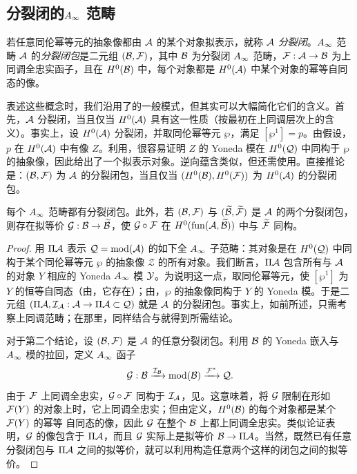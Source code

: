 \subsection{分裂闭的\texorpdfstring{$A_\infty$}{A∞} 范畴}\label{sec:4c}
\begin{definition*}
若任意同伦幂等元的抽象像都由 $\mathcal A$ 的某个对象拟表示，就称 $\mathcal A$ \emph{分裂闭}。$A_\infty$ 范畴 $\mathcal A$ 的\emph{分裂闭包}是二元组 $(\mathcal B,\mathcal F)$，其中 $\mathcal B$ 为分裂闭 $A_\infty$ 范畴，$\mathcal F:\mathcal A\to\mathcal B$ 为上同调全忠实函子，且在 $H^0(\mathcal B)$ 中，每个对象都是 $H^0(\mathcal A)$ 中某个对象的幂等自同态的像。
\end{definition*}
表述这些概念时，我们沿用了的一般模式，但其实可以大幅简化它们的含义。首先，$\mathcal A$ 分裂闭，当且仅当 $H^0(\mathcal A)$ 具有这一性质（按最初在上同调层次上的含义）。事实上，设 $H^0(\mathcal A)$ 分裂闭，并取同伦幂等元 $\wp$，满足 $[\wp^1]=p$。由假设，$p$ 在 $H^0(\mathcal A)$ 中有像 $Z$。利用，很容易证明 $Z$ 的 Yoneda 模在 $H^0(\mathcal Q)$ 中同构于 $\wp$ 的抽象像，因此给出了一个拟表示对象。逆向蕴含类似，但还需使用。直接推论是：$(\mathcal B,\mathcal F)$ 为 $\mathcal A$ 的分裂闭包，当且仅当 $(H^0(\mathcal B),H^0(\mathcal F))$ 为 $H^0(\mathcal A)$ 的分裂闭包。
\begin{lemma}\label{st:4.7}
每个 $A_\infty$ 范畴都有分裂闭包。此外，若 $(\mathcal B,\mathcal F)$ 与 $(\widetilde{\mathcal B},\widetilde{\mathcal F})$ 是 $\mathcal A$ 的两个分裂闭包，则存在拟等价 $\mathcal G:\mathcal B\to\widetilde{\mathcal B}$，使 $\mathcal G\circ\mathcal F$ 在 $H^0(\operatorname{fun}(\mathcal A,\widetilde{\mathcal B}))$ 中与 $\widetilde{\mathcal F}$ 同构。
\end{lemma}
\begin{proof}
用 $\Pi\mathcal A$ 表示 $\mathcal Q=\operatorname{mod}(\mathcal A)$ 的如下全 $A_\infty$ 子范畴：其对象是在 $H^0(\mathcal Q)$ 中同构于某个同伦幂等元 $\wp$ 的抽象像 $\mathcal Z$ 的所有对象。我们断言，$\Pi\mathcal A$ 包含所有与 $\mathcal A$ 的对象 $Y$ 相应的 Yoneda $A_\infty$ 模 $\mathcal Y$。为说明这一点，取同伦幂等元，使 $[\wp^1]$ 为 $Y$ 的恒等自同态（由，它存在）；由，$\wp$ 的抽象像同构于 $Y$ 的 Yoneda 模。于是二元组 $(\Pi\mathcal A,\mathcal I_{\mathcal A}:\mathcal A\to\Pi\mathcal A\subset\mathcal Q)$ 就是 $\mathcal A$ 的分裂闭包。事实上，如前所述，只需考察上同调范畴；在那里，同样结合与就得到所需结论。

对于第二个结论，设 $(\mathcal B,\mathcal F)$ 是 $\mathcal A$ 的任意分裂闭包。利用 $\mathcal B$ 的 Yoneda 嵌入与 $A_\infty$ 模的拉回，定义 $A_\infty$ 函子
\[
\mathcal G:\mathcal B\xrightarrow{\mathcal I_{\mathcal B}}\operatorname{mod}(\mathcal B)\xrightarrow{\mathcal F^*}\mathcal Q.
\]
由于 $\mathcal F$ 上同调全忠实，$\mathcal G\circ\mathcal F$ 同构于 $\mathcal I_{\mathcal A}$，见。这意味着，将 $\mathcal G$ 限制在形如 $\mathcal F(Y)$ 的对象上时，它上同调全忠实；但由定义，$H^0(\mathcal B)$ 的每个对象都是某个 $\mathcal F(Y)$ 的幂等
自同态的像，因此 $\mathcal G$ 在整个 $\mathcal B$ 上都上同调全忠实。类似论证表明，$\mathcal G$ 的像包含于 $\Pi\mathcal A$，而且 $\mathcal G$ 实际上是拟等价 $\mathcal B\to\Pi\mathcal A$。当然，既然已有任意分裂闭包与 $\Pi\mathcal A$ 之间的拟等价，就可以利用构造任意两个这样的闭包之间的拟等价。
\end{proof}
